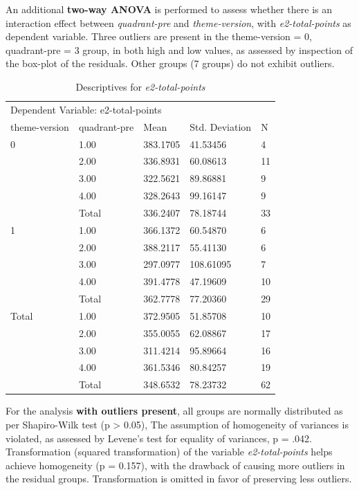 	An additional \textbf{two-way ANOVA} is performed to assess whether there is an interaction effect between \textit{quadrant-pre} and \textit{theme-version}, with \textit{e2-total-points} as dependent variable. Three outliers are present in the theme-version = 0, quadrant-pre = 3 group, in both high and low values, as assessed by inspection of the box-plot of the residuals. Other groups (7 groups) do not exhibit outliers. 
	
	\begin{table}[]
		\centering
		\begin{tabular}{ll|lll}
			\multicolumn{5}{l}{Dependent Variable:   e2-total-points}    \\
			theme-version & quadrant-pre & Mean     & Std. Deviation 			& N  \\ \hline
				0            & 1.00         & 383.1705 		& 41.53456       	& 4  \\
							& 2.00           & 336.8931 	& 60.08613       & 11 \\
							& 3.00           & 322.5621 	& 89.86881       & 9  \\
							& 4.00           & 328.2643 	& 99.16147       & 9  \\
							& Total          & 336.2407 	& 78.18744       & 33 \\ \hline
				1            & 1.00           & 366.1372 	& 60.54870       	& 6  \\
							& 2.00           & 388.2117 	& 55.41130       & 6  \\
							& 3.00           & 297.0977 	& 108.61095      & 7  \\
							& 4.00           & 391.4778 	& 47.19609       & 10 \\
							& Total          & 362.7778 	& 77.20360       & 29 \\ \hline
			Total        	& 1.00         	& 372.9505		 & 51.85708       	& 10 \\
							& 2.00           & 355.0055 	& 62.08867       & 17 \\
							& 3.00           & 311.4214 	& 95.89664       & 16 \\
							& 4.00           & 361.5346 	& 80.84257       & 19 \\
							& Total          & 348.6532 	& 78.23732       & 62
		\end{tabular}
		\caption{Descriptives for \textit{e2-total-points}}
		\label{tbl:h2e2-descriptives}
	\end{table}

	For the analysis \textbf{with outliers present}, all groups are normally distributed as per Shapiro-Wilk test (p > 0.05), The assumption of homogeneity of variances is violated, as assessed by Levene's test for equality of variances, p = .042. Transformation (squared transformation) of the variable \textit{e2-total-points} helps achieve homogeneity (p = 0.157), with the drawback of causing more outliers in the residual groups. Transformation is omitted in favor of preserving less outliers.
	
